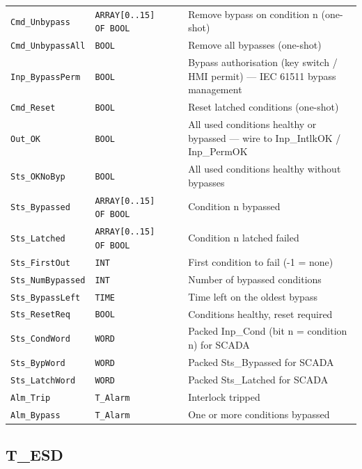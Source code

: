 \begin{small}
\begin{longtable}{@{}P{3.70cm}P{2.20cm}P{1.70cm}P{8.91cm}@{}}
\texttt{Cmd\_Unbypass} & \texttt{ARRAY[0..15] OF BOOL} &  & Remove bypass on condition n (one-shot) \\
\texttt{Cmd\_UnbypassAll} & \texttt{BOOL} &  & Remove all bypasses (one-shot) \\
\texttt{Inp\_BypassPerm} & \texttt{BOOL} &  & Bypass authorisation (key switch /\allowbreak{} HMI permit) --- IEC 61511 bypass management \\
\texttt{Cmd\_Reset} & \texttt{BOOL} &  & Reset latched conditions (one-shot) \\
\texttt{Out\_OK} & \texttt{BOOL} &  & All used conditions healthy or bypassed --- wire to Inp\_IntlkOK /\allowbreak{} Inp\_PermOK \\
\texttt{Sts\_OKNoByp} & \texttt{BOOL} &  & All used conditions healthy without bypasses \\
\texttt{Sts\_Bypassed} & \texttt{ARRAY[0..15] OF BOOL} &  & Condition n bypassed \\
\texttt{Sts\_Latched} & \texttt{ARRAY[0..15] OF BOOL} &  & Condition n latched failed \\
\texttt{Sts\_FirstOut} & \texttt{INT} &  & First condition to fail (-1 = none) \\
\texttt{Sts\_NumBypassed} & \texttt{INT} &  & Number of bypassed conditions \\
\texttt{Sts\_BypassLeft} & \texttt{TIME} &  & Time left on the oldest bypass \\
\texttt{Sts\_ResetReq} & \texttt{BOOL} &  & Conditions healthy, reset required \\
\texttt{Sts\_CondWord} & \texttt{WORD} &  & Packed Inp\_Cond (bit n = condition n) for SCADA \\
\texttt{Sts\_BypWord} & \texttt{WORD} &  & Packed Sts\_Bypassed for SCADA \\
\texttt{Sts\_LatchWord} & \texttt{WORD} &  & Packed Sts\_Latched for SCADA \\
\texttt{Alm\_Trip} & \texttt{T\_Alarm} &  & Interlock tripped \\
\texttt{Alm\_Bypass} & \texttt{T\_Alarm} &  & One or more conditions bypassed \\
\bottomrule
\end{longtable}
\end{small}

\subsection{T\_ESD}\label{sec:pclib-t-esd}

